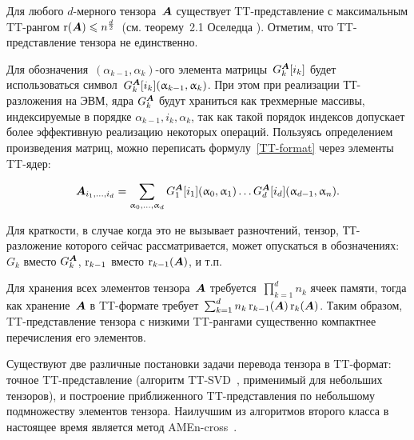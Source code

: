 Для любого $d$-мерного тензора~$\boldsymbol{A}$ существует TT\hyp{}представление с максимальным TT\hyp{}рангом $\operatorname{r}(\boldsymbol{A}) \leqslant n^{\frac{d}{2}}$~(см. теорему~2.1 Оселедца \cite{oseledets2011ttMain}). Отметим, что TT\hyp{}представление тензора не единственно.


Для обозначения~$(\alpha_{k-1}, \alpha_{k})$-ого элемента матрицы~$G_k^{\boldsymbol{A}}[i_k]$ будет использоваться символ~$G_k^{\boldsymbol{A}}[i_k](\upalpha_{k-1}, \upalpha_{k})$. При этом при реализации ТТ-разложения на ЭВМ, ядра $G_k^{\boldsymbol{A}}$ будут храниться как трехмерные массивы, индексируемые в порядке $\alpha_{k-1}, i_k, \alpha_{k}$, так как такой порядок индексов допускает более эффективную реализацию некоторых операций. 
Пользуясь определением произведения матриц, можно переписать формулу~\eqref{TT-format} через элементы TT\hyp{}ядер:

\begin{equation}
	\label{TT-format-sum}
	\boldsymbol{A}_{i_1, \ldots, i_d} =
	\sum_{\upalpha_0, \ldots, \upalpha_d} G^{\boldsymbol{A}}_1[i_1](\upalpha_0, \upalpha_1) \ldots G^{\boldsymbol{A}}_d[i_d](\upalpha_{d-1}, \upalpha_n).
\end{equation}

Для краткости, в случае когда это не вызывает разночтений, тензор, ТТ-разложение которого сейчас рассматривается, может опускаться в обозначениях: $G_k$ вместо $G_k^{\boldsymbol{A}}$, $\operatorname{r}_{k-1}$ вместо $\operatorname{r}_{k-1}(\boldsymbol{A})$, и т.п.

Для хранения всех элементов тензора~$\boldsymbol{A}$ требуется~$\prod_{k=1}^d n_k$ ячеек памяти, тогда как хранение~$\boldsymbol{A}$ в TT\hyp{}формате требует~$\sum_{k=1}^d n_k \operatorname{r}_{k-1}(\boldsymbol{A}) \operatorname{r}_{k}(\boldsymbol{A})$. Таким образом, TT\hyp{}представление тензора с низкими TT\hyp{}рангами существенно компактнее перечисления его элементов.

Существуют две различные постановки задачи перевода тензора в TT\hyp{}формат: точное TT\hyp{}представление (алгоритм TT-SVD~\cite{oseledets2011ttMain}, применимый для небольших тензоров), и построение приближенного TT\hyp{}представления по небольшому подмножеству элементов тензора. Наилучшим из алгоритмов второго класса в настоящее время является метод AMEn-cross~\cite{dolgov2013amenCross}.

